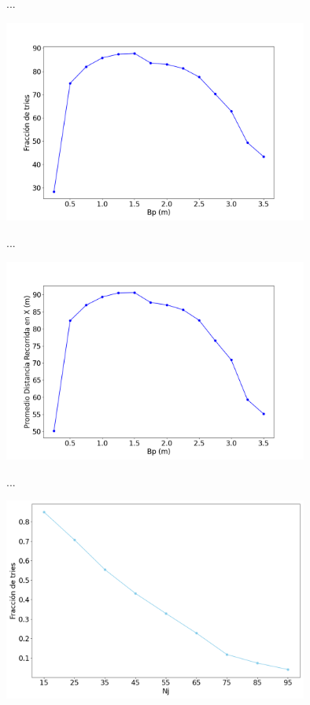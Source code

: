 \begin{frame}{...}
    \begin{center}
        \includegraphics[width=0.75\textwidth]{pic/05-resultados/r7}
    \end{center}
\end{frame}

\begin{frame}{...}
    \begin{center}
        \includegraphics[width=0.75\textwidth]{pic/05-resultados/r8}
    \end{center}
\end{frame}

\begin{frame}{...}
    \begin{center}
        \includegraphics[width=0.75\textwidth]{pic/05-resultados/r9}
    \end{center}
\end{frame}

